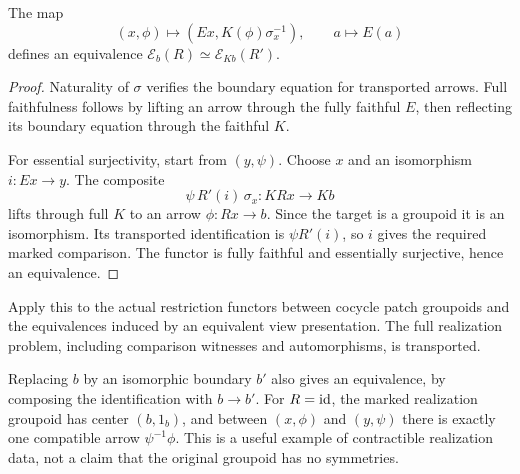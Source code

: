 \begin{theorem}\label{KS39}
The map
\[
 (x,\phi)\longmapsto(Ex,K(\phi)\sigma_x^{-1}),\qquad a\longmapsto E(a)
\]
defines an equivalence \(\mathcal E_b(R)\simeq\mathcal E_{Kb}(R')\).
\end{theorem}
\begin{proof}
Naturality of \(\sigma\) verifies the boundary equation for transported arrows. Full faithfulness follows by lifting an arrow through the fully faithful \(E\), then reflecting its boundary equation through the faithful \(K\).

For essential surjectivity, start from \((y,\psi)\). Choose \(x\) and an isomorphism \(i:Ex\to y\). The composite
\[
 \psi\,R'(i)\,\sigma_x:KRx\to Kb
\]
lifts through full \(K\) to an arrow \(\phi:Rx\to b\). Since the target is a groupoid it is an isomorphism. Its transported identification is \(\psi R'(i)\), so \(i\) gives the required marked comparison. The functor is fully faithful and essentially surjective, hence an equivalence.
\end{proof}
Apply this to the actual restriction functors between cocycle patch groupoids and the equivalences induced by an equivalent view presentation. The full realization problem, including comparison witnesses and automorphisms, is transported.

Replacing \(b\) by an isomorphic boundary \(b'\) also gives an equivalence, by composing the identification with \(b\to b'\). For \(R=\operatorname{id}\), the marked realization groupoid has center \((b,1_b)\), and between \((x,\phi)\) and \((y,\psi)\) there is exactly one compatible arrow \(\psi^{-1}\phi\). This is a useful example of contractible realization data, not a claim that the original groupoid has no symmetries.

